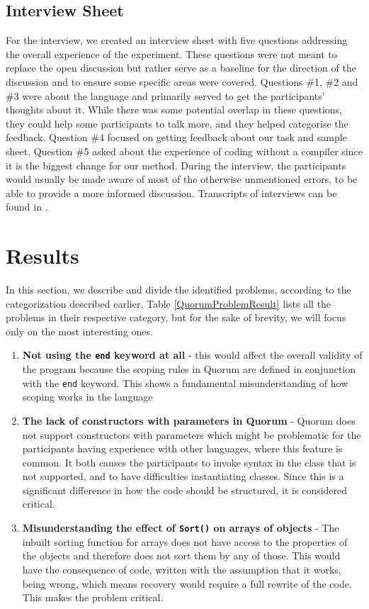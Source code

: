 \documentclass[10pt]{sigplanconf}
\begin{document}
\subsection{Interview Sheet}
For the interview, we created an interview sheet with five questions addressing the overall experience of the experiment.
These questions were not meant to replace the open discussion but rather serve as a baseline for the direction of the discussion and to ensure some specific areas were covered.
Questions \#1, \#2 and \#3 were about the language and primarily served to get the participants' thoughts about it.
While there was some potential overlap in these questions, they could help some participants to talk more, and they helped categorise the feedback.
Question \#4 focused on getting feedback about our task and sample sheet.
Question \#5 asked about the experience of coding without a compiler since it is the biggest change for our method.
During the interview, the participants would usually be made aware of most of the otherwise unmentioned errors, to be able to provide a more informed discussion.
Transcripts of interviews can be found in \cite{thesis}.

\section{Results}
In this section, we describe and divide the identified problems, according to the categorization described earlier. Table \ref{QuorumProblemResult} lists all the problems in their respective category, but for the sake of brevity, we will focus only on the most interesting ones. 

\begin{enumerate}
\item \textbf{Not using the \lstinline!end! keyword at all} - this would affect the overall validity of the program because the scoping rules in Quorum are defined in conjunction with the \lstinline!end! keyword. This shows a fundamental misunderstanding of how scoping works in the language
\item \textbf{The lack of constructors with parameters in Quorum} - Quorum does not support constructors with parameters which might be problematic for the participants having experience with other languages, where this feature is common. It both causes the participants to invoke syntax in the class that is not supported, and to have difficulties instantiating classes. Since this is a significant difference in how the code should be structured, it is considered critical.
\item \textbf{Misunderstanding the effect of \lstinline!Sort()! on arrays of objects} - The inbuilt sorting function for arrays does not have access to the properties of the objects and therefore does not sort them by any of those. This would have the consequence of code, written with the assumption that it works, being wrong, which means recovery would require a full rewrite of the code. This makes the problem critical. 
\end{enumerate}
\end{document}
